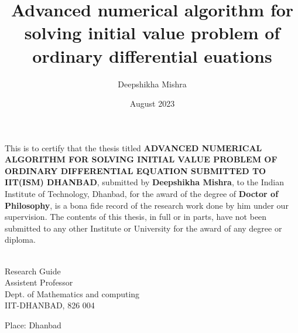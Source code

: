 \documentclass[PhD]{iitmdiss} %
\begin{document}

\title{Advanced numerical algorithm for solving initial value problem of ordinary differential euations}

\author{Deepshikha Mishra}

\date{August 2023}


\maketitle
\certificate

\vspace*{0.5in}

\noindent This is to certify that the thesis titled {\bf ADVANCED NUMERICAL ALGORITHM FOR SOLVING INITIAL VALUE PROBLEM OF ORDINARY DIFFERENTIAL EQUATION SUBMITTED TO IIT(ISM) DHANBAD}, submitted by {\bf Deepshikha Mishra}, 
  to the Indian Institute of Technology, Dhanbad, for
the award of the degree of {\bf Doctor of Philosophy}, is a bona fide
record of the research work done by him under our supervision.  The
contents of this thesis, in full or in parts, have not been submitted
to any other Institute or University for the award of any degree or
diploma.

\vspace*{1.5in}

\begin{singlespacing}
\hspace*{-0.25in}
\parbox{2.5in}{
 \\
\noindent Research Guide \\ 
\noindent Assistent Professor \\
\noindent Dept. of Mathematics and computing\\
\noindent IIT-DHANBAD, 826 004 \\ %
} 
\hspace*{1.0in} 
\end{singlespacing}
\vspace*{0.25in}
\noindent Place: Dhanbad
\end{document}
